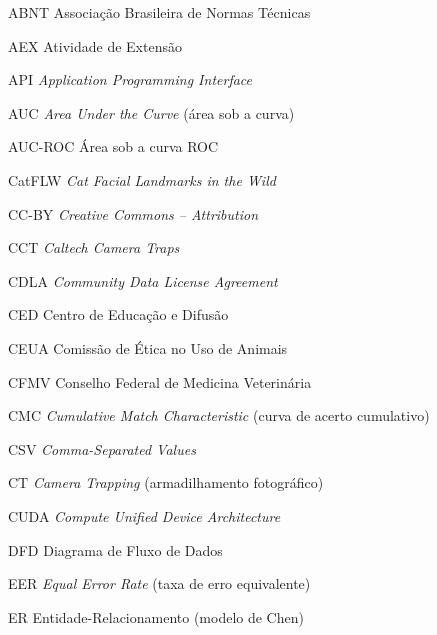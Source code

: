 
\listoffigures*
\cleardoublepage

\listoftables*
\cleardoublepage

\begin{siglas}
  \item[ABNT] Associação Brasileira de Normas Técnicas
  \item[AEX] Atividade de Extensão
  \item[API] \textit{Application Programming Interface}
  \item[AUC] \textit{Area Under the Curve} (área sob a curva)
  \item[AUC-ROC] Área sob a curva ROC
  \item[CatFLW] \textit{Cat Facial Landmarks in the Wild}
  \item[CC-BY] \textit{Creative Commons -- Attribution}
  \item[CCT] \textit{Caltech Camera Traps}
  \item[CDLA] \textit{Community Data License Agreement}
  \item[CED] Centro de Educação e Difusão
  \item[CEUA] Comissão de Ética no Uso de Animais
  \item[CFMV] Conselho Federal de Medicina Veterinária
  \item[CMC] \textit{Cumulative Match Characteristic} (curva de acerto cumulativo)
  \item[CSV] \textit{Comma-Separated Values}
  \item[CT] \textit{Camera Trapping} (armadilhamento fotográfico)
  \item[CUDA] \textit{Compute Unified Device Architecture}
  \item[DFD] Diagrama de Fluxo de Dados
  \item[EER] \textit{Equal Error Rate} (taxa de erro equivalente)
  \item[ER] Entidade-Relacionamento (modelo de Chen)

\end{siglas}
